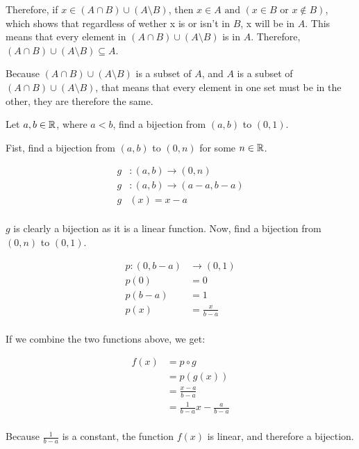 \documentclass[12pt]{article} %
\begin{document}
\begin{homeworkProblem}
    Therefore, if $x \in (A \cap B)\cup (A \setminus B)$, then $x \in A \text{ and } (x \in B \text{ or } x \not \in B)$,
    which shows that regardless of wether x is or isn't in $B$, x will be in $A$. This means that every element in
    $(A \cap B)\cup (A \setminus B)$ is in $A$. Therefore, $(A \cap B)\cup (A \setminus B) \subseteq A$.

    Because $(A \cap B)\cup (A \setminus B)$ is a subset of $A$, and $A$ is a subset of $(A \cap B)\cup (A \setminus B)$, that means that
    every element in one set must be in the other, they are therefore the same.

\end{homeworkProblem}

\pagebreak

\begin{homeworkProblem}
    \begin{grayBoxed}
        Let $a, b \in \mathbb{R}$, where $a < b$, find a bijection from $(a, b)$ to $(0, 1)$.
    \end{grayBoxed}

    Fist, find a bijection from $(a, b)$ to $(0, n)$ for some $n \in \mathbb{R}$.

    \begin{align*}
        g & : (a, b) \rightarrow (0, n)         \\
        g & : (a, b) \rightarrow (a - a, b - a) \\
        g & (x)      = x - a                    \\
    \end{align*}

    $g$ is clearly a bijection as it is a linear function. Now, find a bijection from $(0, n)$ to $(0, 1)$.

    \begin{align*}
        p: (0, b - a) & \rightarrow (0, 1) \\
        p (0)         & = 0                \\
        p (b - a)     & = 1                \\
        p (x)         & = \frac{x}{b - a}  \\
    \end{align*}

    If we combine the two functions above, we get:

    \begin{align*}
        f(x) & = p \circ g                           \\
             & = p(g(x))                             \\
             & = \frac{x - a}{b - a}                 \\
             & = \frac{1}{b - a} x - \frac{a}{b - a} \\
    \end{align*}

    Because $\frac{1}{b - a}$ is a constant, the function $f(x)$ is linear, and therefore a bijection.

\end{homeworkProblem}
\end{document}
